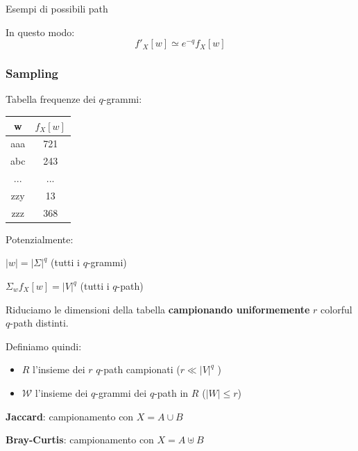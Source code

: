 \begin{frame}
\begin{minipage}{.45\textwidth}
			Esempi di possibili path\medskip
			
			In questo modo:
			\begin{equation*}
				f'_X[w] \simeq e^{-q} f_X[w]
			\end{equation*}
			\hfill
		\end{minipage}\hfill

\end{frame}

\begin{frame}
	\frametitle{Sampling}
	\centering
	
	\pause
	
	\begin{minipage}{.45\textwidth}
		\centering
		
		Tabella frequenze dei $q$-grammi: \medskip
		
		\begin{tabular}{|c|c|}
			\hline
			w   & $f_X[w]$  \\ \hline
			aaa &  721 \\ \hline
			abc &  243 \\ \hline
			... & ... \\ \hline
			zzy &   13 \\ \hline
			zzz &   368 \\ \hline
		\end{tabular}
	
		\medskip
		Potenzialmente:
		\medskip		 
		
		$|w| = |\Sigma|^q$ (tutti i $q$-grammi)
		\medskip		 
		 
		$\Sigma_w{f_X[w]} = |V|^q$ (tutti i $q$-path)
		
		
	\end{minipage}\hfill
	\pause
	\begin{minipage}{.45\textwidth}
		\centering
		Riduciamo le dimensioni della tabella \textbf{campionando uniformemente} $r$ colorful $q$-path distinti.\medskip
		
		Definiamo quindi:
		
		\begin{itemize}
			\item $R$ l'insieme dei $r$ $q$-path campionati ($r \ll |V|^q$ )
			\item $\mathcal{W}$ l'insieme dei $q$-grammi dei $q$-path in $R$ ($|W| \leq r$)
		\end{itemize}
		
		
		
		\hfill
	\end{minipage}\hfill

	\pause

	\bigskip
	
	\textbf{Jaccard}: campionamento con $X = A \cup B$
	
	\textbf{Bray-Curtis}: campionamento con $X = A \uplus B$
	
	
	
\end{frame}

